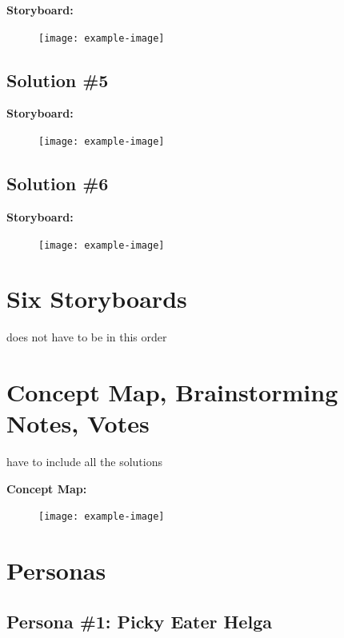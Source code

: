 \documentclass[a4paper,10pt,oneside]{scrreprt}
\begin{document}
			\noindent \textbf{Storyboard:}\\

			\begin{figure}[H]
				\centering
				\texttt{[image: example-image]}
			\end{figure}

		\subsection{Solution \#5}

			\noindent \textbf{Storyboard:}\\

			\begin{figure}[H]
				\centering
				\texttt{[image: example-image]}
			\end{figure}

		\subsection{Solution \#6}

			\noindent \textbf{Storyboard:}\\

			\begin{figure}[H]
				\centering
				\texttt{[image: example-image]}
			\end{figure}

		\bigskip

	\section{Six Storyboards}
		does not have to be in this order

	\section{Concept Map, Brainstorming Notes, Votes}
		have to include all the solutions

			\noindent \textbf{Concept Map:}\\

			\begin{figure}[H]
				\centering
				\texttt{[image: example-image]}
			\end{figure}


	\section{Personas}

		\subsection{Persona \#1: Picky Eater Helga}
\end{document}
